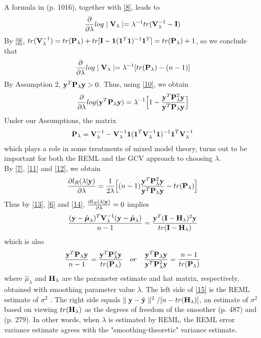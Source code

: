 \documentclass[11pt]{article}
\begin{document}
A formula in \citep{lindstrom_newtonraphson_1988}(p. 1016), together with \eqref{8}, leads to
\begin{align*}
\frac{\partial}{\partial \lambda}log\mid {\bf V}_\lambda \mid=\lambda^{-1}tr({\bf V}_\lambda^{-1}-{\bf I})
\end{align*}
By \eqref{9}, $tr({\bf V}_\lambda^{-1})=tr({\bf P}_\lambda)+tr[{\bf I}-\mathbf{1}(\mathbf{1}^T\mathbf{1})^{-1}\mathbf{1}^T]=tr({\bf P}_\lambda)+1$, so we conclude that
\begin{align}
\frac{\partial}{\partial \lambda}log\mid {\bf V}_\lambda \mid=\lambda^{-1}[tr({\bf P}_\lambda)-(n-1)] \label{11}
\end{align}
By Assumption 2, ${\bf y}^T{\bf P}_\lambda {\bf y}>0$. Thus, using \eqref{10}, we obtain
\begin{align}
\frac{\partial}{\partial \lambda}log({\bf y}^T{\bf P}_\lambda {\bf y})=\lambda^{-1}\Big[1-\frac{{\bf y}^T{\bf P}_\lambda^2{\bf y}}{{\bf y}^T{\bf P}_\lambda {\bf y}} \Big] \label{11}
\end{align}
Under our Assumptions, the matrix
\begin{align*}
{\bf P}_\lambda={\bf V}_\lambda^{-1}-{\bf V}_\lambda^{-1}\mathbf{1}(\mathbf{1}^T{\bf V}_\lambda^{-1}\mathbf{1})^{-1}\mathbf{1}^T{\bf V}_\lambda^{-1}
\end{align*}
which plays a role in some treatments of mixed model theory, turns out to be important for both the REML and the GCV approach to choosing $\lambda$.\\
By \eqref{7}, \eqref{11} and \eqref{12}, we obtain
\begin{align}
\frac{\partial l_R(\lambda|{\bf y})}{\partial \lambda}=\frac{1}{2\lambda}\Big[(n-1)\frac{{\bf y}^T{\bf P}_\lambda^2{\bf y}}{{\bf y}^T{\bf P}_\lambda {\bf y}}- tr({\bf P}_\lambda)\Big] \label{14}
\end{align}
Thus by \eqref{13}, \eqref{6} and \eqref{14}, $\frac{\partial l_R(\lambda|{\bf y})}{\partial \lambda}=0$ implies
\begin{align}
\frac{({\bf y}-\hat{\boldsymbol{\mu}}_\lambda)^T{\bf V}_\lambda^{-1}({\bf y}-\hat{\boldsymbol{\mu}}_\lambda)}{n-1}=\frac{{\bf y}^T ({\bf I}-{\bf H}_\lambda)^2{\bf y}}{tr({\bf I}-{\bf H}_\lambda)} \label{15}
\end{align}
which is also
\begin{align}
\frac{{\bf y}^T{\bf P}_\lambda {\bf y}}{n-1}=\frac{{\bf y}^T {\bf P}_\lambda^2{\bf y}}{tr({\bf P}_\lambda)} \quad or\quad \frac{{\bf y}^T{\bf P}_\lambda {\bf y}}{{\bf y}^T {\bf P}_\lambda^2{\bf y}}=\frac{n-1}{tr({\bf P}_\lambda)}
\end{align}
where $\hat{\mu}_\lambda$ and ${\bf H}_\lambda$ are the parameter estimate and hat matrix, respectively, obtained with smoothing parameter value $\lambda$. The left side of \eqref{15} is the REML estimate of $\sigma^2$ \citep{wahba_spline_1990}. The right side equals $\parallel {\bf y}-\hat{{\bf y}}\parallel ^2/[n-tr({\bf H}_\lambda)]$, an estimate of $\sigma^2$ based on viewing $tr({\bf H}_\lambda)$ as the degrees of freedom of the smoother \citep{pawitan_all_2001}(p. 487) and \citep{lee_generalized_2006}(p. 279). In other words, when $\lambda$ is estimated by REML, the REML error variance estimate agrees with the "smoothing-theoretic" variance estimate.
\end{document}
